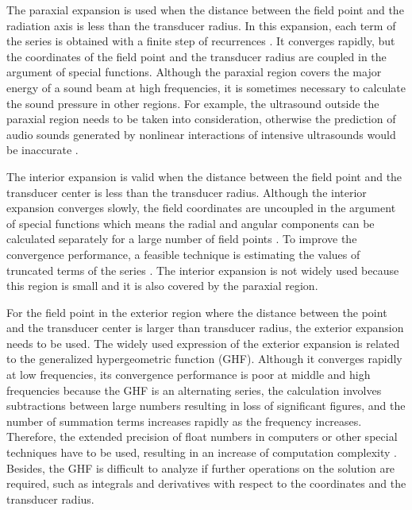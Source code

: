 The paraxial expansion is used when the distance between the field point and the radiation axis is less than the transducer radius. 
In this expansion, each term of the series is obtained with a finite step of recurrences \cite{Mast2005SimplifiedExpansionsRadiation}.
It converges rapidly, but the coordinates of the field point and the transducer radius are coupled in the argument of special functions. 
Although the paraxial region covers the major energy of a sound beam at high frequencies, it is sometimes necessary to calculate the sound pressure in other regions. For example, the ultrasound outside the paraxial region needs to be taken into consideration, otherwise the prediction of audio sounds generated by nonlinear interactions of intensive ultrasounds would be inaccurate \cite{Cervenka2013NonparaxialModelParametric, Zhong2020SphericalExpansionAudio}.

The interior expansion is valid when the distance between the field point and the transducer center is less than the transducer radius. 
Although the interior expansion converges slowly, the field coordinates are uncoupled in the argument of special functions which means the radial and angular components can be calculated separately for a large number of field points \cite{Mast2005SimplifiedExpansionsRadiation, Poletti2018SphericalExpansionsSound}.
To improve the convergence performance, a feasible technique is estimating the values of truncated terms of the series \cite{Poletti2018SphericalExpansionsSound}.
The interior expansion is not widely used because this region is small and it is also covered by the paraxial region. 

For the field point in the exterior region where the distance between the point and the transducer center is larger than transducer radius, the exterior expansion needs to be used. 
The widely used expression of the exterior expansion is related to the generalized hypergeometric function (GHF).
Although it converges rapidly at low frequencies, its convergence performance is poor at middle and high frequencies because the GHF is an alternating series, the calculation involves subtractions between large numbers resulting in loss of significant figures, and the number of summation terms increases rapidly as the frequency increases. 
Therefore, the extended precision of float numbers in computers or other special techniques have to be used, resulting in an increase of computation complexity \cite{Perger1993NumericalEvaluatorGeneralized, Pearson2009ComputationHypergeometricFunctions}.
Besides, the GHF is difficult to analyze if further operations on the solution are required, such as integrals \cite{Cervenka2013NonparaxialModelParametric, Carley2006SeriesExpansionSound} and derivatives \cite{Carley2010SeriesExpansionSound} with respect to the coordinates and the transducer radius.

